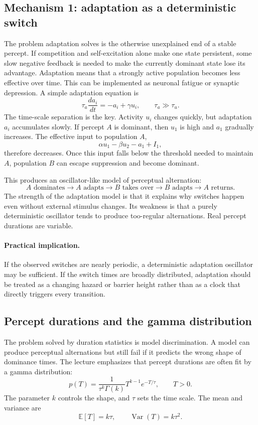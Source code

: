 \subsection{Mechanism 1: adaptation as a deterministic switch}

The problem adaptation solves is the otherwise unexplained end of a stable percept. If competition and self-excitation alone make one state persistent, some slow negative feedback is needed to make the currently dominant state lose its advantage. Adaptation means that a strongly active population becomes less effective over time. This can be implemented as neuronal fatigue or synaptic depression. A simple adaptation equation is
\[
\tau_a \frac{d a_i}{dt}
=
-a_i + \gamma u_i,
\qquad
\tau_a \gg \tau_u .
\]
The time-scale separation is the key. Activity \(u_i\) changes quickly, but adaptation \(a_i\) accumulates slowly. If percept \(A\) is dominant, then \(u_1\) is high and \(a_1\) gradually increases. The effective input to population \(A\),
\[
\alpha u_1-\beta u_2-a_1+I_1,
\]
therefore decreases. Once this input falls below the threshold needed to maintain \(A\), population \(B\) can escape suppression and become dominant.

This produces an oscillator-like model of perceptual alternation:
\[
A \text{ dominates}
\rightarrow A \text{ adapts}
\rightarrow B \text{ takes over}
\rightarrow B \text{ adapts}
\rightarrow A \text{ returns}.
\]
The strength of the adaptation model is that it explains why switches happen even without external stimulus changes. Its weakness is that a purely deterministic oscillator tends to produce too-regular alternations. Real percept durations are variable.

\paragraph{Practical implication.}
If the observed switches are nearly periodic, a deterministic adaptation oscillator may be sufficient. If the switch times are broadly distributed, adaptation should be treated as a changing hazard or barrier height rather than as a clock that directly triggers every transition.

\subsection{Percept durations and the gamma distribution}

The problem solved by duration statistics is model discrimination. A model can produce perceptual alternations but still fail if it predicts the wrong shape of dominance times. The lecture emphasizes that percept durations are often fit by a gamma distribution:
\[
p(T)
=
\frac{1}{\tau^k \Gamma(k)}
T^{k-1}e^{-T/\tau},
\qquad
T>0.
\]
The parameter \(k\) controls the shape, and \(\tau\) sets the time scale. The mean and variance are
\[
\mathbb{E}[T]=k\tau,
\qquad
\operatorname{Var}(T)=k\tau^2.
\]

